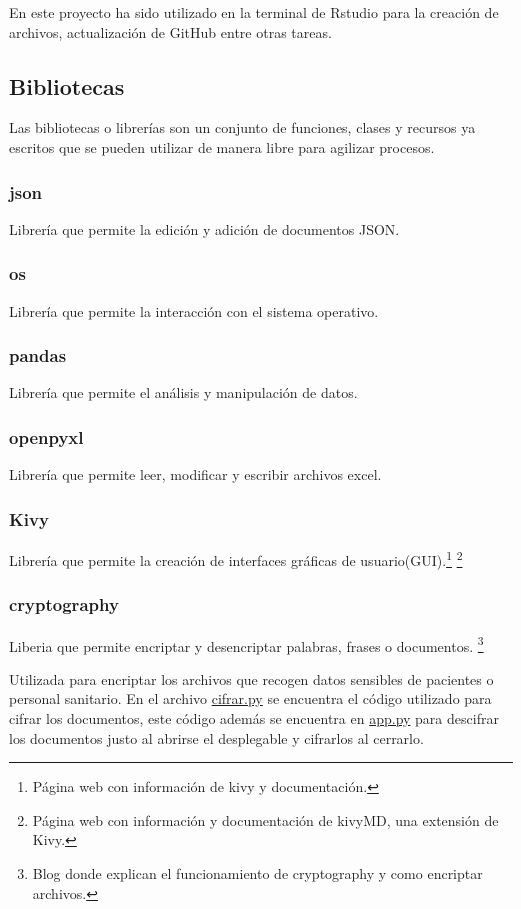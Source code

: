 En este proyecto ha sido utilizado en la terminal de Rstudio para la creación de archivos, actualización de GitHub entre otras tareas.

\subsection{Bibliotecas}
Las bibliotecas o librerías son un conjunto de funciones, clases y recursos ya escritos que se pueden utilizar de manera libre para agilizar procesos. 
\subsubsection{json}
Librería que permite la edición y adición de documentos JSON.
\subsubsection{os}
Librería que permite la interacción con el sistema operativo.
\subsubsection{pandas}
Librería que permite el análisis y manipulación de datos.
\subsubsection{openpyxl}
Librería que permite leer, modificar y escribir archivos excel.
\subsubsection{Kivy}
Librería que permite la creación de interfaces gráficas de usuario(GUI).\cite{kivy}\footnote{Página web con información de kivy y documentación\cite{kivy}.}
\cite{KivyMD}\footnote{Página web con información y documentación de kivyMD, una extensión de Kivy\cite{KivyMD}.}
\subsubsection{cryptography}

Liberia que permite encriptar y desencriptar palabras, frases o documentos. \cite{ruh_encriptar_2023}\footnote{Blog donde explican el funcionamiento de cryptography y como encriptar archivos\cite{ruh_encriptar_2023}.}

Utilizada para encriptar los archivos que recogen datos sensibles de pacientes o personal sanitario. En el archivo \href{https://github.com/cva1003/TFG/blob/main/Aplicaci%C3%B3nEscritorio/cifrar.py} {cifrar.py} se encuentra el código utilizado para cifrar los documentos, este código además se encuentra en \href{https://github.com/cva1003/TFG/blob/main/Aplicaci%C3%B3nEscritorio/app.py} {app.py} para descifrar los documentos justo al abrirse el desplegable y cifrarlos al cerrarlo.
